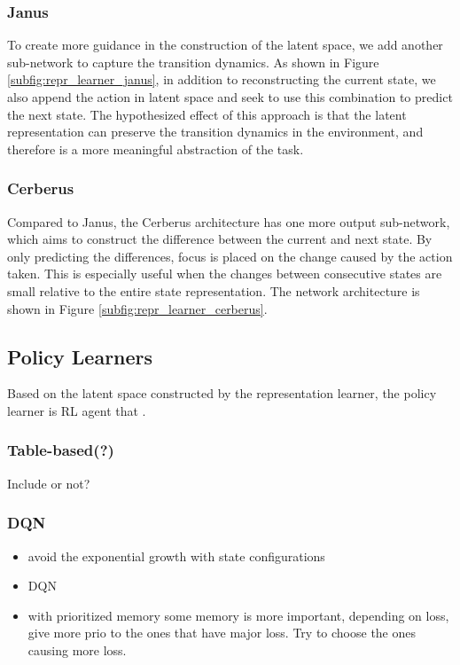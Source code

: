 \subsubsection{Janus}
To create more guidance in the construction of the latent space, we add another sub-network to capture the transition dynamics. 
As shown in Figure \ref{subfig:repr_learner_janus},
in addition to reconstructing the current state, we also append the action in latent space and seek to use this combination to predict the next state.
The hypothesized effect of this approach is that the latent representation can preserve the transition dynamics in the environment, and therefore is a more meaningful abstraction of the task.


\subsubsection{Cerberus}
Compared to Janus, the Cerberus architecture has one more output sub-network, which aims to construct the difference between the current and next state. 
By only predicting the differences, focus is placed on the change caused by the action taken.
This is especially useful when the changes between consecutive states are small relative to the entire state representation.
The network architecture is shown in Figure \ref{subfig:repr_learner_cerberus}.  

\subsection{Policy Learners}
Based on the latent space constructed by the representation learner, the policy learner is RL agent that .

\subsubsection{Table-based(?)}
Include or not?

\subsubsection{DQN}
\begin{itemize}
	\item avoid the exponential growth with state configurations
	\item DQN \citep{DQN} 
	\item with prioritized memory \citep{prioritized_memory} some memory is more important, depending on loss, give more prio to the ones that have major loss. Try to choose the ones causing more loss. 
\end{itemize}

